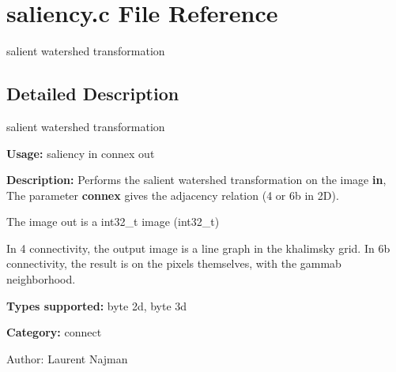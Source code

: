 \section{saliency.c File Reference}
\label{saliency_8c}
salient watershed transformation 



\subsection{Detailed Description}
salient watershed transformation 

{\bf Usage:} saliency in connex out

{\bf Description:} Performs the salient watershed transformation on the image {\bf in}, The parameter {\bf connex} gives the adjacency relation (4 or 6b in 2D).

The image out is a int32\_\-t image (int32\_\-t)

In 4 connectivity, the output image is a line graph in the khalimsky grid. In 6b connectivity, the result is on the pixels themselves, with the gammab neighborhood.

{\bf Types supported:} byte 2d, byte 3d

{\bf Category:} connect

\begin{Desc}
\item[Author:]Laurent Najman \end{Desc}

